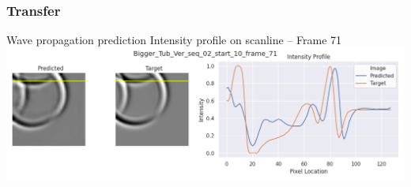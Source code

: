 \begin{frame}
    \frametitle{Transfer}

Wave propagation prediction \newline
Intensity profile on scanline -- Frame 71\\[\baselineskip]

\includegraphics[width=\textwidth, height=.55\textheight]{./Ressourcen/Praesentation/Bilder/WaveTransfer/DFP/Bigger_Tub_Ver_seq_02_start_10_frame_71.png}%

\end{frame}
\clearpage
